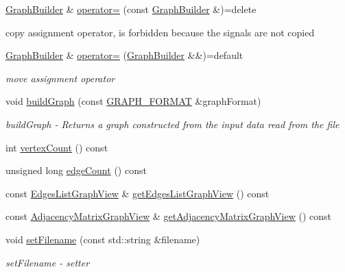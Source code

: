 \begin{DoxyCompactItemize}
\hyperlink{classmin__path_1_1graph__builder_1_1_graph_builder}{Graph\+Builder} \& \hyperlink{classmin__path_1_1graph__builder_1_1_graph_builder_ad25912e3925a0b5d272e439c133dbaed}{operator=} (const \hyperlink{classmin__path_1_1graph__builder_1_1_graph_builder}{Graph\+Builder} \&)=delete
\begin{DoxyCompactList}\small\item\em 
\begin{DoxyItemize}
\item copy assignment operator, is forbidden because the signals are not copied 
\end{DoxyItemize}\end{DoxyCompactList}\item 
\hyperlink{classmin__path_1_1graph__builder_1_1_graph_builder}{Graph\+Builder} \& \hyperlink{classmin__path_1_1graph__builder_1_1_graph_builder_a956ae5330a7549448b3a65d18ef3256f}{operator=} (\hyperlink{classmin__path_1_1graph__builder_1_1_graph_builder}{Graph\+Builder} \&\&)=default
\begin{DoxyCompactList}\small\item\em move assignment operator \end{DoxyCompactList}\item 
void \hyperlink{classmin__path_1_1graph__builder_1_1_graph_builder_af93f9ccc6ee766b6e9103b0410118251}{build\+Graph} (const \hyperlink{namespacemin__path_1_1service_a1f61bb8d119aded91f38ff564193177c}{G\+R\+A\+P\+H\+\_\+\+F\+O\+R\+M\+AT} \&graph\+Format)
\begin{DoxyCompactList}\small\item\em build\+Graph -\/ Returns a graph constructed from the input data read from the file \end{DoxyCompactList}\item 
int \hyperlink{classmin__path_1_1graph__builder_1_1_graph_builder_a1f87c00f0c33d05c43c303d944e98e20}{vertex\+Count} () const 
\item 
unsigned long \hyperlink{classmin__path_1_1graph__builder_1_1_graph_builder_ab11f2d747657833d8858412550213206}{edge\+Count} () const 
\item 
const \hyperlink{namespacemin__path_1_1service_aa7134896d837083f384364b56a32bb49}{Edges\+List\+Graph\+View} \& \hyperlink{classmin__path_1_1graph__builder_1_1_graph_builder_a92a552ca053196f8f86f6449f47ed795}{get\+Edges\+List\+Graph\+View} () const 
\item 
const \hyperlink{namespacemin__path_1_1service_af657481a4b0a05546de6e9c1023bd9f5}{Adjacency\+Matrix\+Graph\+View} \& \hyperlink{classmin__path_1_1graph__builder_1_1_graph_builder_a54d8756fc2746a29b5cdb99a731ee9fb}{get\+Adjacency\+Matrix\+Graph\+View} () const 
\item 
void \hyperlink{classmin__path_1_1graph__builder_1_1_graph_builder_ae1e8d98a704fa5a7a5ad316259d95d6b}{set\+Filename} (const std\+::string \&filename)
\begin{DoxyCompactList}\small\item\em set\+Filename -\/ setter \end{DoxyCompactList}\end{DoxyCompactItemize}



